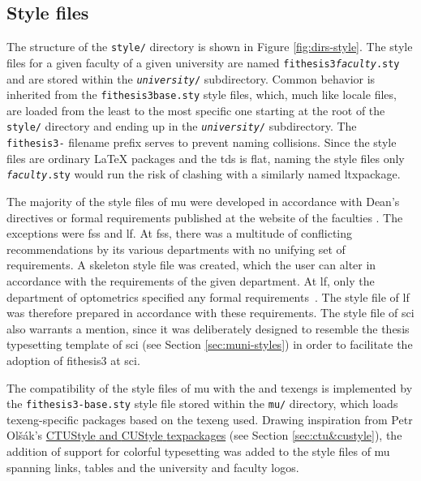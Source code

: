 \documentclass[12pt,twoside,color,table]%
  {fithesis3/fithesis3/fithesis3} %
\begin{document}
  \subsection{Style files}\label{sec:dev-styles}
  The structure of the \texttt{style/} directory is shown in Figure
  \ref{fig:dirs-style}. The style files for a given faculty of a
  given university are named
  \texttt{fithesis3\hyph{}\textit{faculty}.sty} and
  are stored within the \texttt{\textit{university}/}
  subdirectory. Common behavior is inherited from the
  \texttt{fithesis3\hyph{}base.sty} style files,
  which, much like locale files, are loaded from the least to the
  most specific one starting at the root of the \texttt{style/}
  directory and ending up in the
  \texttt{\textit{university}/} subdirectory. The
  \texttt{fithesis3-} filename prefix serves to prevent naming
  collisions. Since the style files are ordinary \LaTeX{} packages
  and the \gls{tds} is flat, naming the style files only
  \texttt{\textit{faculty}.sty} would run the risk of clashing with
  a similarly named \gls{ltxpackage}.

  The majority of the style files of \gls{mu} were developed in
  accordance with Dean's directives or formal requirements
  published at the website of the faculties \cite{ffdirective,
  peddirective,scidirective,lawdirective,fidirective,fspsdirective}.
  The exceptions were \gls{fss} and \gls{lf}. At \gls{fss}, there
  was a multitude of conflicting recommendations by its various
  departments with no unifying set of requirements. A skeleton
  style file was created, which the user can alter
  in accordance with the requirements of the given department. At
  \gls{lf}, only the department of optometrics specified any
  formal requirements~\cite{meddirective}. The style file of
  \gls{lf} was therefore prepared in accordance with these
  requirements. The style file of \gls{sci} also warrants a
  mention, since it was deliberately designed to resemble the
  thesis typesetting template of \gls{sci} (see Section
  \ref{sec:muni-styles}) in order to facilitate the adoption of
  \textsf{fithesis3} at \gls{sci}.
  
  The compatibility of the style files of \gls{mu} with the
   and  \glspl{texeng} is implemented
  by the \texttt{fithesis3-base.sty} style file stored within the
  \texttt{mu/} directory, which loads \gls{texeng}-specific
  packages based on the \gls{texeng} used. Drawing inspiration
  from Petr Olšák's \hyperref[sec:ctu&custyle]{\textsf{CTUStyle}
   and
  \textsf{CUStyle} \glspl{texpackage}}
  (see Section \ref{sec:ctu&custyle}), the addition of support for
  colorful typesetting was added to the style files of \gls{mu}
  spanning links, tables and the university and faculty logos.
\end{document}
